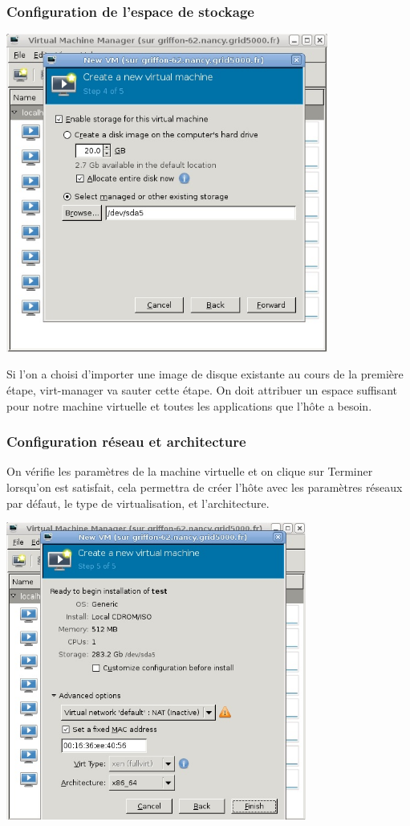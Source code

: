 \subsubsection{Configuration de l'espace de stockage}
\begin{center}
\includegraphics[width=300pt]{images/Storage.jpg}
\end{center}

 Si l'on a choisi d'importer une image de disque existante au cours de la première étape, virt-manager va sauter cette étape.
On doit attribuer un espace suffisant pour notre machine virtuelle et toutes les applications que l'hôte a besoin.

\subsubsection{ Configuration réseau et architecture}
On vérifie les paramètres de la machine virtuelle et on clique sur Terminer lorsqu'on est satisfait, cela permettra de créer l'hôte avec les paramètres réseaux par défaut, le type de virtualisation, et l'architecture.
\begin{center}
\includegraphics[width=280pt]{images/reseau.jpg}
\end{center}


